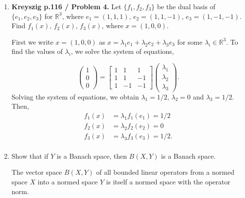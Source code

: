 \documentclass[12pt]{article}
\newcommand{\rl}{\mathbb{R}}
\begin{document}
\begin{enumerate}
 
\item \textbf{Kreyszig p.116 / Problem 4.}
    Let $\{f_1,f_2,f_3\}$ be the dual basis of $\{e_1,
    e_2, e_3\}$ for $\rl^3$, where $e_1 = (1,1,1)$,
    $e_2 = (1,1, -1)$, $e_3 = (1, -1, -1)$.
    Find $f_1(x)$, $f_2(x)$, $f_3(x)$, where
    $x =(1, 0, 0)$.
\begin{mybox}

   First we write $x=(1,0,0)$ as $x=\lambda_1 e_1+
   \lambda_2 e_2 +\lambda_3 e_3$ for some
   $\lambda_i\in\rl^3$. To find the values of $\lambda_i$,
   we solve the system of equations,

   $$\left(\begin{array}{c}
    1\\
    0\\
    0\end{array}
    \right)=\left[\begin{array}{ccc}
    1   &1  &1\\
    1   &1  &-1\\
    1  &-1 &-1
\end{array}\right]\left(\begin{array}{c}
    \lambda_1\\
    \lambda_2\\
    \lambda_3
\end{array}\right).$$
Solving the system of equations, we obtain
$\lambda_1=1/2$, $\lambda_2=0$ and $\lambda_3=1/2$. Then,
\begin{align*}
    f_1(x) &= \lambda_1 f_1(e_1)=1/2\\
    f_2(x) &= \lambda_2 f_2(e_2)=0\\
    f_3(x) &= \lambda_3 f_3(e_3)=1/2.\\
\end{align*}
\end{mybox}
 
\item Show that if $Y$ is a Banach space,
    then $B(X, Y)$ is a Banach space.  
\begin{mybox}
    
    The vector space $B(X, Y)$ of all bounded linear
    operators from a normed space $X$ into a normed space
    $Y$ is itself a normed space with the operator norm.


\end{mybox}
\end{enumerate}
\end{document}
